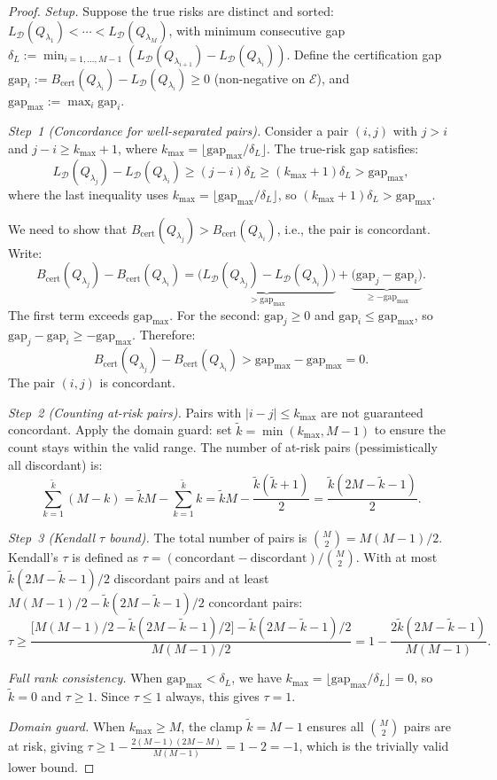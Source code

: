 \documentclass[11pt,a4paper]{article}
\newcommand{\cD}{\mathcal{D}}
\newcommand{\gapmax}{\mathrm{gap}_{\max}}
\begin{document}
\begin{proof}
\emph{Setup.} Suppose the true risks are distinct and sorted: $L_\cD(Q_{\lambda_1}) < \cdots < L_\cD(Q_{\lambda_M})$, with minimum consecutive gap $\delta_L := \min_{i=1,\dots,M-1}(L_\cD(Q_{\lambda_{i+1}}) - L_\cD(Q_{\lambda_i}))$. Define the certification gap $\mathrm{gap}_i := B_{\mathrm{cert}}(Q_{\lambda_i}) - L_\cD(Q_{\lambda_i}) \ge 0$ (non-negative on $\mathcal{E}$), and $\gapmax := \max_{i} \mathrm{gap}_i$.

\emph{Step~1 (Concordance for well-separated pairs).} Consider a pair $(i,j)$ with $j > i$ and $j - i \ge k_{\max} + 1$, where $k_{\max} = \lfloor \gapmax / \delta_L \rfloor$. The true-risk gap satisfies:
\[
L_\cD(Q_{\lambda_j}) - L_\cD(Q_{\lambda_i}) \ge (j-i)\delta_L \ge (k_{\max}+1)\delta_L > \gapmax,
\]
where the last inequality uses $k_{\max} = \lfloor \gapmax/\delta_L \rfloor$, so $(k_{\max}+1)\delta_L > \gapmax$.

We need to show that $B_{\mathrm{cert}}(Q_{\lambda_j}) > B_{\mathrm{cert}}(Q_{\lambda_i})$, i.e., the pair is concordant. Write:
\[
B_{\mathrm{cert}}(Q_{\lambda_j}) - B_{\mathrm{cert}}(Q_{\lambda_i}) = \underbrace{\bigl(L_\cD(Q_{\lambda_j}) - L_\cD(Q_{\lambda_i})\bigr)}_{> \gapmax} + \underbrace{\bigl(\mathrm{gap}_j - \mathrm{gap}_i\bigr)}_{\ge -\gapmax}.
\]
The first term exceeds $\gapmax$. For the second: $\mathrm{gap}_j \ge 0$ and $\mathrm{gap}_i \le \gapmax$, so $\mathrm{gap}_j - \mathrm{gap}_i \ge -\gapmax$. Therefore:
\[
B_{\mathrm{cert}}(Q_{\lambda_j}) - B_{\mathrm{cert}}(Q_{\lambda_i}) > \gapmax - \gapmax = 0.
\]
The pair $(i,j)$ is concordant.

\emph{Step~2 (Counting at-risk pairs).} Pairs with $|i - j| \le k_{\max}$ are not guaranteed concordant. Apply the domain guard: set $\tilde{k} = \min(k_{\max}, M-1)$ to ensure the count stays within the valid range. The number of at-risk pairs (pessimistically all discordant) is:
\[
\sum_{k=1}^{\tilde{k}} (M - k) = \tilde{k} M - \sum_{k=1}^{\tilde{k}} k = \tilde{k} M - \frac{\tilde{k}(\tilde{k}+1)}{2} = \frac{\tilde{k}(2M - \tilde{k} - 1)}{2}.
\]

\emph{Step~3 (Kendall $\tau$ bound).} The total number of pairs is $\binom{M}{2} = M(M-1)/2$. Kendall's $\tau$ is defined as $\tau = (\text{concordant} - \text{discordant})/\binom{M}{2}$. With at most $\tilde{k}(2M - \tilde{k} - 1)/2$ discordant pairs and at least $M(M-1)/2 - \tilde{k}(2M - \tilde{k} - 1)/2$ concordant pairs:
\[
\tau \ge \frac{\bigl[M(M-1)/2 - \tilde{k}(2M-\tilde{k}-1)/2\bigr] - \tilde{k}(2M-\tilde{k}-1)/2}{M(M-1)/2} = 1 - \frac{2\tilde{k}(2M - \tilde{k} - 1)}{M(M-1)}.
\]

\emph{Full rank consistency.} When $\gapmax < \delta_L$, we have $k_{\max} = \lfloor \gapmax/\delta_L \rfloor = 0$, so $\tilde{k} = 0$ and $\tau \ge 1$. Since $\tau \le 1$ always, this gives $\tau = 1$.

\emph{Domain guard.} When $k_{\max} \ge M$, the clamp $\tilde{k} = M - 1$ ensures all $\binom{M}{2}$ pairs are at risk, giving $\tau \ge 1 - \frac{2(M-1)(2M - M)}{M(M-1)} = 1 - 2 = -1$, which is the trivially valid lower bound.
\end{proof}
\end{document}
